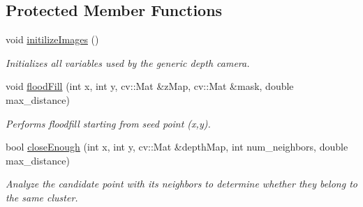 \subsection*{Protected Member Functions}
\begin{DoxyCompactItemize}
\item 
void \hyperlink{class_depth_camera_a02f2fbde7cf4a340ace92278c89c66ef}{initilize\+Images} ()
\begin{DoxyCompactList}\small\item\em Initializes all variables used by the generic depth camera. \end{DoxyCompactList}\item 
void \hyperlink{class_depth_camera_acebcf84d24ce5bfd0b1392547dc79eb1}{flood\+Fill} (int x, int y, cv\+::\+Mat \&z\+Map, cv\+::\+Mat \&mask, double max\+\_\+distance)
\begin{DoxyCompactList}\small\item\em Performs floodfill starting from seed point (x,y). \end{DoxyCompactList}\item 
bool \hyperlink{class_depth_camera_ab24ac78c2cf29b0410c3d5e0dfc9a243}{close\+Enough} (int x, int y, cv\+::\+Mat \&depth\+Map, int num\+\_\+neighbors, double max\+\_\+distance)
\begin{DoxyCompactList}\small\item\em Analyze the candidate point with its neighbors to determine whether they belong to the same cluster. \end{DoxyCompactList}\end{DoxyCompactItemize}
